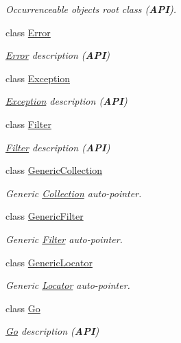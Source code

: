 \begin{DoxyCompactItemize}
\begin{DoxyCompactList}\small\item\em Occurrenceable objects root class ({\bfseries A\+PI}). \end{DoxyCompactList}\item 
class \hyperlink{classHurricane_1_1Error}{Error}
\begin{DoxyCompactList}\small\item\em \hyperlink{classHurricane_1_1Error}{Error} description ({\bfseries A\+PI}) \end{DoxyCompactList}\item 
class \hyperlink{classHurricane_1_1Exception}{Exception}
\begin{DoxyCompactList}\small\item\em \hyperlink{classHurricane_1_1Exception}{Exception} description ({\bfseries A\+PI}) \end{DoxyCompactList}\item 
class \hyperlink{classHurricane_1_1Filter}{Filter}
\begin{DoxyCompactList}\small\item\em \hyperlink{classHurricane_1_1Filter}{Filter} description ({\bfseries A\+PI}) \end{DoxyCompactList}\item 
class \hyperlink{classHurricane_1_1GenericCollection}{Generic\+Collection}
\begin{DoxyCompactList}\small\item\em Generic \hyperlink{classHurricane_1_1Collection}{Collection} auto-\/pointer. \end{DoxyCompactList}\item 
class \hyperlink{classHurricane_1_1GenericFilter}{Generic\+Filter}
\begin{DoxyCompactList}\small\item\em Generic \hyperlink{classHurricane_1_1Filter}{Filter} auto-\/pointer. \end{DoxyCompactList}\item 
class \hyperlink{classHurricane_1_1GenericLocator}{Generic\+Locator}
\begin{DoxyCompactList}\small\item\em Generic \hyperlink{classHurricane_1_1Locator}{Locator} auto-\/pointer. \end{DoxyCompactList}\item 
class \hyperlink{classHurricane_1_1Go}{Go}
\begin{DoxyCompactList}\small\item\em \hyperlink{classHurricane_1_1Go}{Go} description ({\bfseries A\+PI}) \end{DoxyCompactList}\item 

\end{DoxyCompactItemize}
